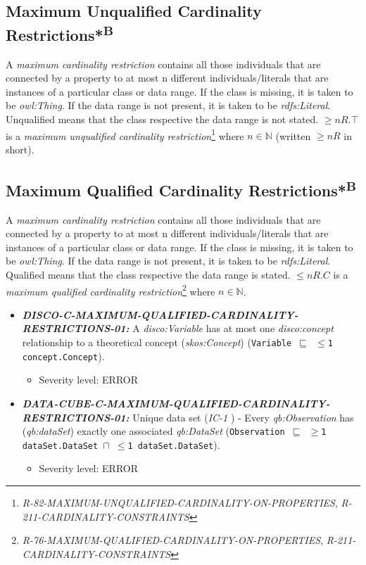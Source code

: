 \documentclass{llncs}
\newcommand{\ms}[1]{\texttt{#1}}
\begin{document}
\subsection{Maximum Unqualified Cardinality Restrictions*\textsuperscript{B}}

A \emph{maximum cardinality restriction} contains all those individuals that are connected by a property to at most n different individuals/literals that are instances of a particular class or data range. If the class is missing, it is taken to be \emph{owl:Thing}. If the data range is not present, it is taken to be \emph{rdfs:Literal}.
Unqualified means that the class respective the data range is not stated. 
$\geq n R. \top$ is a \emph{maximum unqualified cardinality restriction}\footnote{\emph{R-82-MAXIMUM-UNQUALIFIED-CARDINALITY-ON-PROPERTIES}, \emph{R-211-CARDINALITY-CONSTRAINTS}} where $n \in \mathbb{N}$ (written $\geq  n R$ in short).

\subsection{Maximum Qualified Cardinality Restrictions*\textsuperscript{B}}

A \emph{maximum cardinality restriction} contains all those individuals that are connected by a property to at most n different individuals/literals that are instances of a particular class or data range. If the class is missing, it is taken to be \emph{owl:Thing}. If the data range is not present, it is taken to be \emph{rdfs:Literal}.
Qualified means that the class respective the data range is stated. 
$\leq n R. C$ is a \emph{maximum qualified cardinality restriction}\footnote{\emph{R-76-MAXIMUM-QUALIFIED-CARDINALITY-ON-PROPERTIES}, \emph{R-211-CARDINALITY-CONSTRAINTS}} where $n \in \mathbb{N}$.

\begin{itemize}
	\item \textbf{{\em DISCO-C-MAXIMUM-QUALIFIED-CARDINALITY-RESTRICTIONS-01:}}
	A {\em disco:Variable} has at most one {\em disco:concept} relationship to a theoretical concept ({\em skos:Concept}) (\ms{Variable $\sqsubseteq$ $\leq$1 concept.Concept}).
	\begin{itemize}
		\item Severity level: ERROR
	\end{itemize}
	\item \textbf{{\em DATA-CUBE-C-MAXIMUM-QUALIFIED-CARDINALITY-RESTRICTIONS-01:}}
	Unique data set (\emph{IC-1} \cite{CyganiakReynolds2014}) -  
	Every \emph{qb:Observation} has (\emph{qb:dataSet}) exactly one associated \emph{qb:DataSet} (\ms{Observation $\sqsubseteq$ $\geq$1 dataSet.DataSet $\sqcap$ $\leq$1 dataSet.DataSet}). 
	\begin{itemize}
		\item Severity level: ERROR
	\end{itemize}
\end{itemize}
\end{document}
